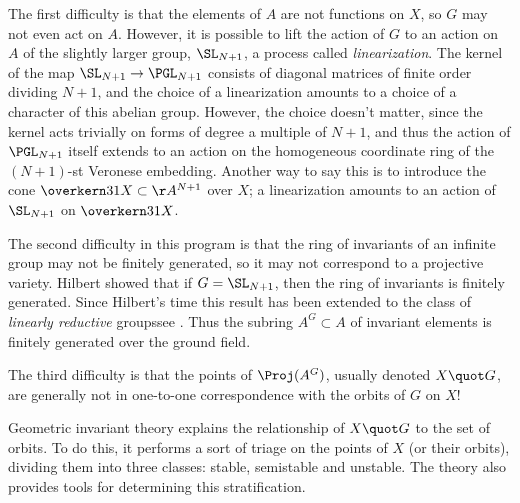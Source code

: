 The first difficulty is that the elements of $A$ are not functions on $X$, so $G$ may not even act on $A$. However,
it is possible to lift the action of $G$ to an action on $A$ of the
slightly larger group, $\SL_{N+1}$, a process called
%
\emph{linearization}. The kernel of the map $\SL_{N+1} \to \PGL_{N+1}$
consists of diagonal matrices of finite order dividing $N+1$, and the choice of
a linearization amounts to a choice of a character of this abelian
group. However, the choice doesn't 
matter,
since the kernel acts trivially on forms of degree a multiple
of $N+1$, 
and thus
the action of $\PGL_{N+1}$ itself  extends to an action on the
homogeneous coordinate ring of the $(N+1)$-st Veronese embedding.
Another way to say this is to introduce the cone $\overkern31 X
\subset \AA^{N+1}$ over $X$; a linearization amounts to an action of
$\SL_{N+1}$ on $\overkern31 X$.%
{\meshing\par}

The second difficulty in this program is that the ring of invariants
of an infinite group may not 
be finitely generated,
so it may not correspond to a projective variety. Hilbert showed that if $G= \SL_{N+1}$, then the ring of invariants
is finitely generated. Since Hilbert's time this result has been extended to the class of
\emph{linearly reductive}
%
groups\emdash see \cite{MR0382294}.
Thus the subring $A^G \subset A$ of invariant elements is finitely generated over the ground field.

The third difficulty is that the points of $\Proj(A^G)$, usually
denoted $X\quot G$, are generally not in one-to-one correspondence
with the orbits of $G$ on $X$!

Geometric invariant theory explains the relationship of $X\quot G$ to the set of orbits. To do this, it performs a sort of triage on the points of $X$ (or their orbits), dividing them into three classes: stable, semistable and unstable. The theory also provides tools for determining this stratification.


